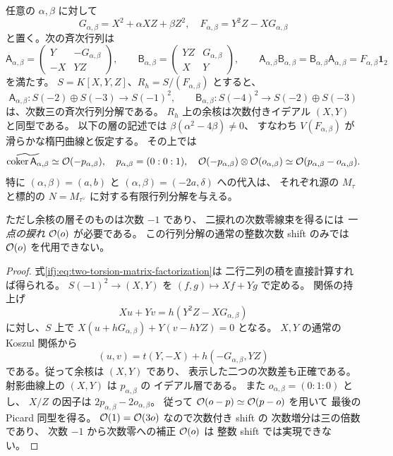 \begin{proposition}
\label{ifj:prop:two-torsion-matrix-factorization}
任意の $\alpha,\beta$ に対して
\[
 G_{\alpha,\beta}=X^2+\alpha XZ+\beta Z^2,\quad
 F_{\alpha,\beta}=Y^2Z-XG_{\alpha,\beta}
\]
と置く。次の斉次行列は
\begin{equation}\label{ifj:eq:two-torsion-matrix-factorization}
 \mathsf A_{\alpha,\beta}
 =\begin{pmatrix}Y&-G_{\alpha,\beta}\\-X&YZ\end{pmatrix},
 \qquad
 \mathsf B_{\alpha,\beta}
 =\begin{pmatrix}YZ&G_{\alpha,\beta}\\X&Y\end{pmatrix},
 \qquad
 \mathsf A_{\alpha,\beta}\mathsf B_{\alpha,\beta}
 =\mathsf B_{\alpha,\beta}\mathsf A_{\alpha,\beta}
 =F_{\alpha,\beta}\mathbf1_2
\end{equation}
を満たす。
$S=K[X,Y,Z]$、$R_h=S/(F_{\alpha,\beta})$ とすると、
\[
 \mathsf A_{\alpha,\beta}:
 S(-2)\oplus S(-3)\longrightarrow S(-1)^2,\qquad
 \mathsf B_{\alpha,\beta}:S(-4)^2
         \longrightarrow S(-2)\oplus S(-3)
\]
は、次数三の斉次行列分解である。
$R_h$ 上の余核は次数付きイデアル $(X,Y)$ と同型である。
以下の層の記述では $\beta(\alpha^2-4\beta)\ne0$、
すなわち $V(F_{\alpha,\beta})$ が滑らかな楕円曲線と仮定する。
その上では
\[
 \widetilde{\operatorname{coker}\mathsf A_{\alpha,\beta}}
   \simeq\mathcal O(-p_{\alpha,\beta}),\quad
 p_{\alpha,\beta}=(0:0:1),\quad
 \mathcal O(-p_{\alpha,\beta})\otimes\mathcal O(o_{\alpha,\beta})
   \simeq\mathcal O(p_{\alpha,\beta}-o_{\alpha,\beta}).
\]
特に $(\alpha,\beta)=(a,b)$ と
$(\alpha,\beta)=(-2a,\delta)$ への代入は、
それぞれ源の $M_\tau$ と標的の
$N=M_{\tau^\vee}$ に対する有限行列分解を与える。

ただし余核の層そのものは次数 $-1$ であり、
二捩れの次数零線束を得るには
\emph{一点の捩れ} $\mathcal O(o)$ が必要である。
この行列分解の通常の整数次数 shift のみでは
$\mathcal O(o)$ を代用できない。
\end{proposition}

\begin{proof}
式\eqref{ifj:eq:two-torsion-matrix-factorization}は
二行二列の積を直接計算すれば得られる。
$S(-1)^2\to(X,Y)$ を
$(f,g)\mapsto Xf+Yg$ で定める。
関係の持上げ
\[
 Xu+Yv=h(Y^2Z-XG_{\alpha,\beta})
\]
に対し、$S$ 上で
$X(u+hG_{\alpha,\beta})+Y(v-hYZ)=0$ となる。
$X,Y$ の通常の Koszul 関係から
\[
 (u,v)=t(Y,-X)+h(-G_{\alpha,\beta},YZ)
\]
である。従って余核は $(X,Y)$ であり、
表示した二つの次数差も正確である。
射影曲線上の $(X,Y)$ は $p_{\alpha,\beta}$ の
イデアル層である。
また $o_{\alpha,\beta}=(0:1:0)$ とし、
$X/Z$ の因子は $2p_{\alpha,\beta}-2o_{\alpha,\beta}$。
従って $\mathcal O(o-p)\simeq\mathcal O(p-o)$ を用いて
最後の Picard 同型を得る。
$\mathcal O(1)=\mathcal O(3o)$ なので次数付き shift の
次数増分は三の倍数であり、
次数 $-1$ から次数零への補正 $\mathcal O(o)$ は
整数 shift では実現できない。
\end{proof}

